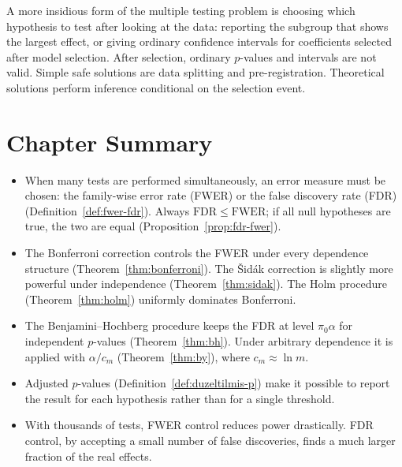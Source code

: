 \documentclass[main.tex]{subfiles}
\begin{document}
\begin{remark}
A more insidious form of the multiple testing problem is choosing which hypothesis to test after looking at the data: reporting the subgroup that shows the largest effect, or giving ordinary confidence intervals for coefficients selected after model selection. After selection, ordinary $p$-values and intervals are not valid. Simple safe solutions are data splitting and pre-registration. Theoretical solutions perform inference conditional on the selection event.
\end{remark}

\section{Chapter Summary}
\begin{summary}
\begin{itemize}
  \item When many tests are performed simultaneously, an error measure must be chosen: the family-wise error rate (FWER) or the false discovery rate (FDR) (Definition~\ref{def:fwer-fdr}). Always $\mathrm{FDR}\le\mathrm{FWER}$; if all null hypotheses are true, the two are equal (Proposition~\ref{prop:fdr-fwer}).
  \item The Bonferroni correction controls the FWER under every dependence structure (Theorem~\ref{thm:bonferroni}). The Šidák correction is slightly more powerful under independence (Theorem~\ref{thm:sidak}). The Holm procedure (Theorem~\ref{thm:holm}) uniformly dominates Bonferroni.
  \item The Benjamini--Hochberg procedure keeps the FDR at level $\pi_0\alpha$ for independent $p$-values (Theorem~\ref{thm:bh}). Under arbitrary dependence it is applied with $\alpha/c_m$ (Theorem~\ref{thm:by}), where $c_m\approx\ln m$.
  \item Adjusted $p$-values (Definition~\ref{def:duzeltilmis-p}) make it possible to report the result for each hypothesis rather than for a single threshold.
  \item With thousands of tests, FWER control reduces power drastically. FDR control, by accepting a small number of false discoveries, finds a much larger fraction of the real effects.
\end{itemize}
\end{summary}
\end{document}
